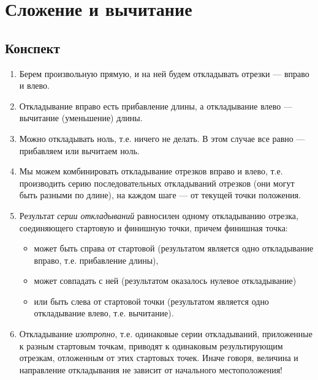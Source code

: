 

\section{Сложение и вычитание}

\subsection{Конспект}
\begin{enumerate}\setlength{\itemsep}{1pt}
\item Берем произвольную прямую, и на ней будем откладывать отрезки --- вправо и влево.
\item Откладывание вправо есть прибавление длины, а откладывание влево --- вычитание (уменьшение) длины.
\item Можно откладывать ноль, т.е. ничего не делать. В этом случае все равно --- прибавляем или вычитаем ноль.
\item Мы можем комбинировать откладывание отрезков вправо и влево, т.е. производить серию последовательных откладываний отрезков (они могут быть разными по длине), на каждом шаге --- от текущей точки положения.
\item Результат \textit{серии откладываний} равносилен одному откладыванию отрезка, соединяющего стартовую и финишную точки, причем финишная точка:
\begin{itemize}
\item может быть справа от стартовой (результатом является одно откладывание вправо, т.е. прибавление длины),
\item может совпадать с ней (результатом оказалось нулевое откладывание)
\item или быть слева от стартовой точки (результатом является одно откладывание влево, т.е. вычитание).
\end{itemize}
\item Откладывание \textit{изотропно}, т.е. одинаковые серии откладываний, приложенные к разным стартовым точкам, приводят к одинаковым результирующим отрезкам, отложенным от этих стартовых точек. Иначе говоря, величина и направление откладывания не зависит от начального местоположения!
\end{enumerate}
